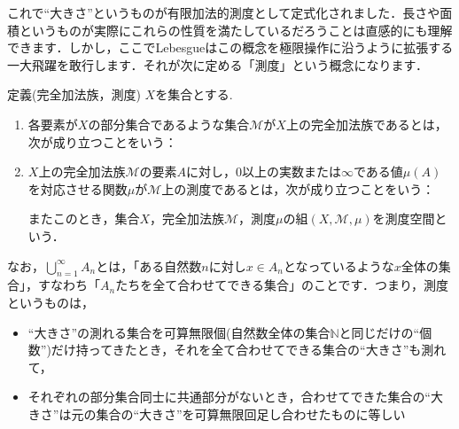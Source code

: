 \par これで“大きさ”というものが有限加法的測度として定式化されました．長さや面積というものが実際にこれらの性質を満たしているだろうことは直感的にも理解できます．しかし，ここでLebesgueはこの概念を極限操作に沿うように拡張する一大飛躍を敢行します．それが次に定める「測度」という概念になります．
\begin{itembox}[l]{定義(完全加法族，測度)}
$X$を集合とする. 
\begin{enumerate}
\item 各要素が$X$の部分集合であるような集合$\mathcal{M}$が$X$上の完全加法族であるとは，次が成り立つことをいう：
\item $X$上の完全加法族$\mathcal{M}$の要素$A$に対し，0以上の実数または$\infty$である値$\mu(A)$を対応させる関数$\mu$が$\mathcal{M}$上の測度であるとは，次が成り立つことをいう：
またこのとき，集合$X$，完全加法族$\mathcal{M}$，測度$\mu$の組$(X, \mathcal{M}, \mu)$を測度空間という．
\end{enumerate}
\end{itembox}
\par  なお，$\displaystyle\bigcup_{n=1}^{\infty}A_{n}$とは，「ある自然数$n$に対し$x\in A_{n}$となっているような$x$全体の集合」，すなわち「$A_{n}$たちを全て合わせてできる集合」のことです．つまり，測度というものは，
\begin{itemize}
\item “大きさ”の測れる集合を可算無限個(自然数全体の集合$\mathbb{N}$と同じだけの“個数”)だけ持ってきたとき，それを全て合わせてできる集合の“大きさ”も測れて，
\item それぞれの部分集合同士に共通部分がないとき，合わせてできた集合の“大きさ”は元の集合の“大きさ”を可算無限回足し合わせたものに等しい
\end{itemize}

